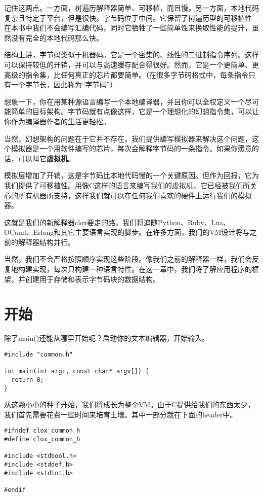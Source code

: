 \documentclass[cn,11pt,chinese]{elegantbook}
\begin{document}
记住这两点。一方面，树遍历解释器简单、可移植，而且慢。另一方面，本地代码复杂且特定于平台，但是很快。字节码位于中间。它保留了树遍历型的可移植性—在本书中我们不会编写汇编代码，同时它牺牲了一些简单性来换取性能的提升，虽然没有完全的本地代码那么快。

结构上讲，字节码类似于机器码。它是一个密集的、线性的二进制指令序列。这样可以保持较低的开销，并可以与高速缓存配合得很好。然而，它是一个更简单、更高级的指令集，比任何真正的芯片都要简单。（在很多字节码格式中，每条指令只有一个字节长，因此称为“字节码”）

想象一下，你在用某种源语言编写一个本地编译器，并且你可以全权定义一个尽可能简单的目标架构。字节码就有点像这样，它是一个理想化的幻想指令集，可以让你作为编译器作者的生活更轻松。

当然，幻想架构的问题在于它并不存在。我们提供编写模拟器来解决这个问题，这个模拟器是一个用软件编写的芯片，每次会解释字节码的一条指令。如果你愿意的话，可以叫它\textbf{虚拟机}。

模拟层增加了开销，这是字节码比本地代码慢的一个关键原因。但作为回报，它为我们提供了可移植性。用像C这样的语言来编写我们的虚拟机，它已经被我们所关心的所有机器所支持，这样我们就可以在任何我们喜欢的硬件上运行我们的模拟器。

这就是我们的新解释器clox要走的路。我们将追随Python、Ruby、Lua、OCaml、Erlang和其它主要语言实现的脚步。在许多方面，我们的VM设计将与之前的解释器结构并行。

当然，我们不会严格按照顺序实现这些阶段。像我们之前的解释器一样，我们会反复地构建实现，每次只构建一种语言特性。在这一章中，我们将了解应用程序的框架，并创建用于存储和表示字节码块的数据结构。

\section{开始}

除了main()还能从哪里开始呢？启动你的文本编辑器，开始输入。

\begin{verbatim}
#include "common.h"

int main(int argc, const char* argv[]) {
  return 0;
}
\end{verbatim}

从这颗小小的种子开始，我们将成长为整个VM。由于C提供给我们的东西太少，我们首先需要花费一些时间来培育土壤。其中一部分就在下面的header中。

\begin{verbatim}
#ifndef clox_common_h
#define clox_common_h

#include <stdbool.h>
#include <stddef.h>
#include <stdint.h>

#endif
\end{verbatim}
\end{document}
